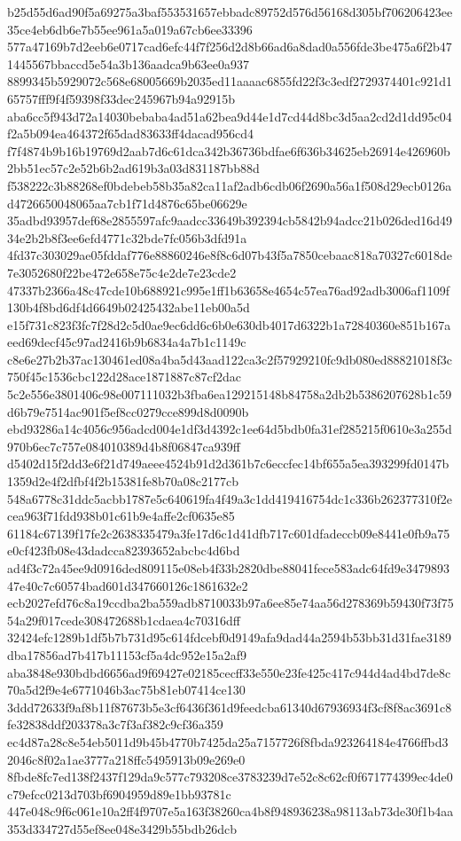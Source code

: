 \documentclass[11pt,a4paper]{article}
\begin{document}
{b25d55d6ad90f5a69275a3baf553531657ebbadc89752d576d56168d305bf706206423ee35ce4eb6db6e7b55ee961a5a019a67cb6ee33396
577a47169b7d2eeb6e0717cad6efc44f7f256d2d8b66ad6a8dad0a556fde3be475a6f2b471445567bbaccd5e54a3b136aadca9b63ee0a937
8899345b5929072c568e68005669b2035ed11aaaac6855fd22f3c3edf2729374401c921d165757fff9f4f59398f33dec245967b94a92915b
aba6cc5f943d72a14030bebaba4ad51a62bea9d44e1d7cd44d8bc3d5aa2cd2d1dd95c04f2a5b094ea464372f65dad83633ff4dacad956cd4
f7f4874b9b16b19769d2aab7d6c61dca342b36736bdfae6f636b34625eb26914e426960b2bb51ec57c2e52b6b2ad619b3a03d831187bb88d
f538222c3b88268ef0bdebeb58b35a82ca11af2adb6cdb06f2690a56a1f508d29ecb0126ad4726650048065aa7cb1f71d4876c65be06629e
35adbd93957def68e2855597afc9aadcc33649b392394cb5842b94adcc21b026ded16d4934e2b2b8f3ee6efd4771c32bde7fc056b3dfd91a
4fd37c303029ae05fddaf776e88860246e8f8c6d07b43f5a7850cebaac818a70327c6018de7e3052680f22be472e658e75c4e2de7e23cde2
47337b2366a48c47cde10b688921c995e1ff1b63658e4654c57ea76ad92adb3006af1109f130b4f8bd6df4d6649b02425432abe11eb00a5d
e15f731c823f3fc7f28d2c5d0ae9ec6dd6c6b0e630db4017d6322b1a72840360e851b167aeed69decf45c97ad2416b9b6834a4a7b1c1149c
c8e6e27b2b37ac130461ed08a4ba5d43aad122ca3c2f57929210fc9db080ed88821018f3c750f45c1536cbc122d28ace1871887c87cf2dac
5c2e556e3801406c98e007111032b3fba6ea129215148b84758a2db2b5386207628b1c59d6b79e7514ac901f5ef8cc0279cce899d8d0090b
ebd93286a14c4056c956adcd004e1df3d4392c1ee64d5bdb0fa31ef285215f0610e3a255d970b6ec7c757e084010389d4b8f06847ca939ff
d5402d15f2dd3e6f21d749aeee4524b91d2d361b7c6eccfec14bf655a5ea393299fd0147b1359d2e4f2dfbf4f2b15381fe8b70a08c2177cb
548a6778c31ddc5acbb1787e5c640619fa4f49a3c1dd419416754dc1c336b262377310f2ecea963f71fdd938b01c61b9e4affe2cf0635e85
61184c67139f17fe2c2638335479a3fe17d6c1d41dfb717c601dfadeccb09e8441e0fb9a75e0cf423fb08e43dadcca82393652abcbc4d6bd
ad4f3c72a45ee9d0916ded809115e08eb4f33b2820dbe88041fece583adc64fd9e347989347e40c7c60574bad601d347660126c1861632e2
ecb2027efd76c8a19ccdba2ba559adb8710033b97a6ee85e74aa56d278369b59430f73f7554a29f017cede308472688b1cdaea4c70316dff
32424efc1289b1df5b7b731d95c614fdcebf0d9149afa9dad44a2594b53bb31d31fae3189dba17856ad7b417b11153cf5a4dc952e15a2af9
aba3848e930bdbd6656ad9f69427e02185cecff33e550e23fe425c417c944d4ad4bd7de8c70a5d2f9e4e6771046b3ac75b81eb07414ce130
3ddd72633f9af8b11f87673b5e3cf6436f361d9feedcba61340d67936934f3cf8f8ac3691c8fe32838ddf203378a3c7f3af382c9cf36a359
ec4d87a28c8e54eb5011d9b45b4770b7425da25a7157726f8fbda923264184e4766ffbd32046c8f02a1ae3777a218ffc5495913b09e269e0
8fbde8fc7ed138f2437f129da9c577c793208ce3783239d7e52c8c62cf0f671774399ec4de0c79efcc0213d703bf6904959d89e1bb93781c
447e048c9f6c061e10a2ff4f9707e5a163f38260ca4b8f948936238a98113ab73de30f1b4aa353d334727d55ef8ee048e3429b55bdb26dcb
}
\end{document}
